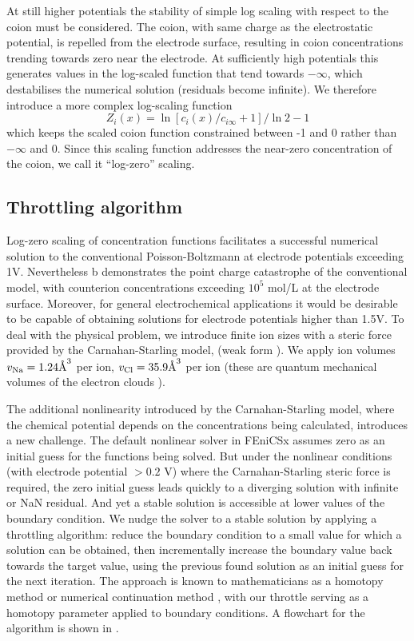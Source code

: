 At still higher potentials the stability of simple log scaling with
respect to the coion must be considered. The coion, with same charge
as the electrostatic potential, is repelled from the electrode surface,
resulting in coion concentrations trending towards zero near the electrode. At
sufficiently high potentials this generates values in the log-scaled
function that tend towards $-\infty$, which destabilises the numerical
solution (residuals become infinite). We therefore introduce a more complex log-scaling function
\begin{equation}
Z_i(x) = \ln\left[c_i(x)/c_{i\infty}+1\right]/\ln 2 - 1
\label{log_zero}
\end{equation}
which keeps the scaled coion function constrained between -1 and 0
rather than $-\infty$ and 0. Since this scaling function addresses the
near-zero concentration of the coion, we call it ``log-zero'' scaling.

\subsection{Throttling algorithm}

Log-zero scaling of concentration functions facilitates a successful numerical solution to
the conventional Poisson-Boltzmann at electrode potentials
exceeding 1V. Nevertheless b demonstrates the
point charge catastrophe of the conventional model, with counterion
concentrations exceeding $10^{5}$ mol/L at the electrode
surface. Moreover, for general electrochemical applications it would
be desirable to be capable of obtaining solutions for electrode
potentials higher than 1.5V. To deal with the physical problem, we
introduce finite ion sizes with a steric force provided by the
Carnahan-Starling model,  (weak form
).  We apply ion volumes
$v_{\ce{Na}}=1.24 \textrm{\AA}^{3}$ per  ion,
$v_{\ce{Cl}}=35.9 \textrm{\AA}^{3}$ per  ion (these are
quantum mechanical volumes of the electron clouds \citep{ParsonsNinham2009}).

The additional nonlinearity introduced by the Carnahan-Starling model,
where the chemical potential depends on the concentrations being
calculated, introduces a new challenge. The default nonlinear solver
in FEniCSx assumes zero as an initial guess for the functions being
solved. But under the nonlinear conditions (with electrode potential
$>0.2$ V) where the Carnahan-Starling steric force is required, the
zero initial guess leads quickly to a diverging solution with infinite
or NaN
residual. And yet a stable solution is accessible at lower values of
the boundary condition. We nudge the solver to a stable solution by
applying a throttling algorithm: reduce the boundary condition to a
small value for which a solution can be obtained, then incrementally
increase the boundary value back towards the target value, using the
previous found solution as an initial guess for the next
iteration. The approach is known to mathematicians as a homotopy
method \citep{homotopy_analysis_Liao2012}
or numerical continuation method \citep{allgower1990numerical},
with our throttle serving as a homotopy parameter applied to boundary
conditions.  A flowchart for the algorithm is shown in
.

